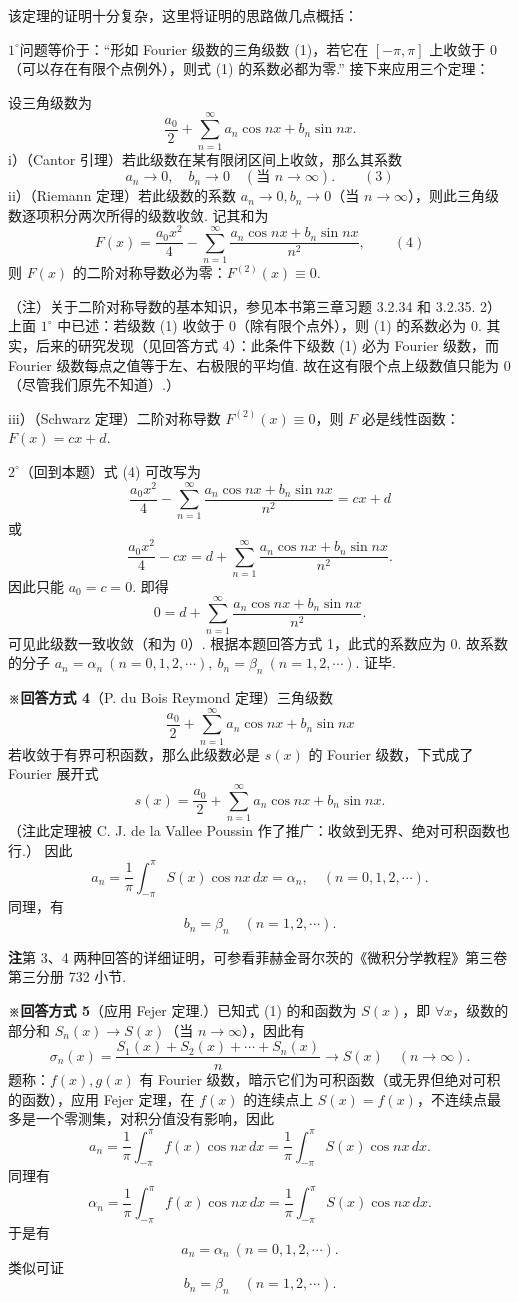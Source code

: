 \documentclass[UTF8, 12pt, fontset=fandol, oneside]{ctexart}
\begin{document}
该定理的证明十分复杂，这里将证明的思路做几点概括：

$1^\circ$\quad 问题等价于：``形如 Fourier 级数的三角级数 (1)，若它在 $[-\pi,\pi]$ 上收敛于 0（可以存在有限个点例外），则式 (1) 的系数必都为零.'' 接下来应用三个定理：

设三角级数为
\[
  \frac{a_0}{2}+\sum_{n=1}^{\infty}a_n\cos nx+b_n\sin nx.
\]
i）（Cantor 引理）若此级数在某有限闭区间上收敛，那么其系数
\[
  a_n\to0,\quad b_n\to0\quad(\text{当 }n\to\infty). \qquad(3)
\]
ii）（Riemann 定理）若此级数的系数 $a_n\to0,b_n\to0$（当 $n\to\infty$），则此三角级数逐项积分两次所得的级数收敛. 记其和为
\[
  F(x)=\frac{a_0x^2}{4}-\sum_{n=1}^{\infty}\frac{a_n\cos nx+b_n\sin nx}{n^2}, \qquad(4)
\]
则 $F(x)$ 的二阶对称导数必为零：$F^{(2)}(x)\equiv0$.

（注）关于二阶对称导数的基本知识，参见本书第三章习题 3.2.34 和 3.2.35. 2）上面 $1^\circ$ 中已述：若级数 (1) 收敛于 0（除有限个点外），则 (1) 的系数必为 0. 其实，后来的研究发现（见回答方式 4）：此条件下级数 (1) 必为 Fourier 级数，而 Fourier 级数每点之值等于左、右极限的平均值. 故在这有限个点上级数值只能为 0（尽管我们原先不知道）.）

iii）（Schwarz 定理）二阶对称导数 $F^{(2)}(x)\equiv0$，则 $F$ 必是线性函数：$F(x)=cx+d$.

$2^\circ$\quad （回到本题）式 (4) 可改写为
\[
  \frac{a_0x^2}{4}-\sum_{n=1}^{\infty}\frac{a_n\cos nx+b_n\sin nx}{n^2}=cx+d
\]
或
\[
  \frac{a_0x^2}{4}-cx=d+\sum_{n=1}^{\infty}\frac{a_n\cos nx+b_n\sin nx}{n^2}.
\]
因此只能 $a_0=c=0$. 即得
\[
  0=d+\sum_{n=1}^{\infty}\frac{a_n\cos nx+b_n\sin nx}{n^2}.
\]
可见此级数一致收敛（和为 0）. 根据本题回答方式 1，此式的系数应为 0. 故系数的分子
$a_n=\alpha_n\ (n=0,1,2,\cdots),\ b_n=\beta_n\ (n=1,2,\cdots)$. 证毕.

\noindent\textbf{※回答方式 4}\quad （P. du Bois Reymond 定理）三角级数
\[
  \frac{a_0}{2}+\sum_{n=1}^{\infty}a_n\cos nx+b_n\sin nx
\]
若收敛于有界可积函数，那么此级数必是 $s(x)$ 的 Fourier 级数，下式成了 Fourier 展开式
\[
  s(x)=\frac{a_0}{2}+\sum_{n=1}^{\infty}a_n\cos nx+b_n\sin nx.
\]
（注\quad 此定理被 C. J. de la Vallee Poussin 作了推广：收敛到无界、绝对可积函数也行.）
因此
\[
  a_n=\frac1\pi\int_{-\pi}^{\pi}S(x)\cos nx\,dx=\alpha_n,\quad(n=0,1,2,\cdots).
\]
同理，有
\[
  b_n=\beta_n\quad(n=1,2,\cdots).
\]

\noindent\textbf{注}\quad 第 3、4 两种回答的详细证明，可参看菲赫金哥尔茨的《微积分学教程》第三卷第三分册 732 小节.

\noindent\textbf{※回答方式 5}\quad （应用 Fejer 定理.）已知式 (1) 的和函数为 $S(x)$，即 $\forall x$，级数的部分和
$S_n(x)\to S(x)$（当 $n\to\infty$），因此有
\[
  \sigma_n(x)=\frac{S_1(x)+S_2(x)+\cdots+S_n(x)}{n}\to S(x)\quad(n\to\infty).
\]
题称：$f(x),g(x)$ 有 Fourier 级数，暗示它们为可积函数（或无界但绝对可积的函数），应用 Fejer 定理，在
$f(x)$ 的连续点上 $S(x)=f(x)$，不连续点最多是一个零测集，对积分值没有影响，因此
\[
  a_n=\frac1\pi\int_{-\pi}^{\pi}f(x)\cos nx\,dx
  =\frac1\pi\int_{-\pi}^{\pi}S(x)\cos nx\,dx.
\]
同理有
\[
  \alpha_n=\frac1\pi\int_{-\pi}^{\pi}f(x)\cos nx\,dx
  =\frac1\pi\int_{-\pi}^{\pi}S(x)\cos nx\,dx.
\]
于是有
\[
  a_n=\alpha_n\ (n=0,1,2,\cdots).
\]
类似可证
\[
  b_n=\beta_n\quad(n=1,2,\cdots).
\]
\end{document}
